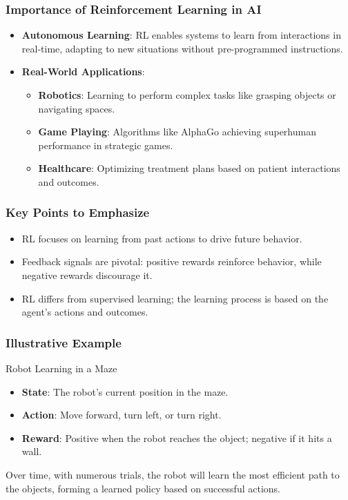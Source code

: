 \documentclass{beamer}
\begin{document}
\begin{frame}[fragile]
    \frametitle{Importance of Reinforcement Learning in AI}
    \begin{itemize}
        \item \textbf{Autonomous Learning}: RL enables systems to learn from interactions in real-time, adapting to new situations without pre-programmed instructions.
        \item \textbf{Real-World Applications}:
        \begin{itemize}
            \item \textbf{Robotics}: Learning to perform complex tasks like grasping objects or navigating spaces.
            \item \textbf{Game Playing}: Algorithms like AlphaGo achieving superhuman performance in strategic games.
            \item \textbf{Healthcare}: Optimizing treatment plans based on patient interactions and outcomes.
        \end{itemize}
    \end{itemize}
\end{frame}

\begin{frame}[fragile]
    \frametitle{Key Points to Emphasize}
    \begin{itemize}
        \item RL focuses on learning from past actions to drive future behavior.
        \item Feedback signals are pivotal: positive rewards reinforce behavior, while negative rewards discourage it.
        \item RL differs from supervised learning; the learning process is based on the agent’s actions and outcomes.
    \end{itemize}
\end{frame}

\begin{frame}[fragile]
    \frametitle{Illustrative Example}
    \begin{block}{Robot Learning in a Maze}
        \begin{itemize}
            \item \textbf{State}: The robot's current position in the maze.
            \item \textbf{Action}: Move forward, turn left, or turn right.
            \item \textbf{Reward}: Positive when the robot reaches the object; negative if it hits a wall.
        \end{itemize}
        Over time, with numerous trials, the robot will learn the most efficient path to the objects, forming a learned policy based on successful actions.
    \end{block}
\end{frame}
\end{document}
